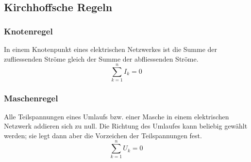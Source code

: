 \subsection{Kirchhoffsche Regeln}

\subsubsection{Knotenregel}

In einem Knotenpunkt eines elektrischen Netzwerkes ist die Summe der
zufliessenden Ströme gleich der Summe der abfliessenden Ströme.
\[
	\sum_{k=1}^n I_k = 0
\]

\subsubsection{Maschenregel}

Alle Teilspannungen eines Umlaufs bzw. einer Masche in einem elektrischen
Netzwerk addieren sich zu null. Die Richtung des Umlaufes kann beliebig gewählt
werden; sie legt dann aber die Vorzeichen der Teilspannungen fest.
\[
	\sum_{k=1}^n U_k = 0
\]
